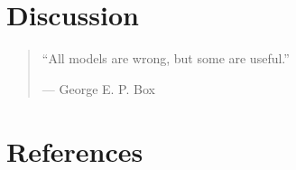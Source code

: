 \documentclass[11pt, a4paper, twosided]{book}
\begin{document}
\hypertarget{discussion}{%
\chapter{Discussion}\label{discussion}}
\begin{quote}
``All models are wrong, but some are useful.''

\hfill --- George E. P. Box
\end{quote}
\newpage

\hypertarget{references}{%
\chapter*{References}\label{references}}

\noindent

\setlength{\parindent}{-0.5cm}
\setlength{\leftskip}{0.5cm}
\setlength{\parskip}{8pt}
\end{document}
